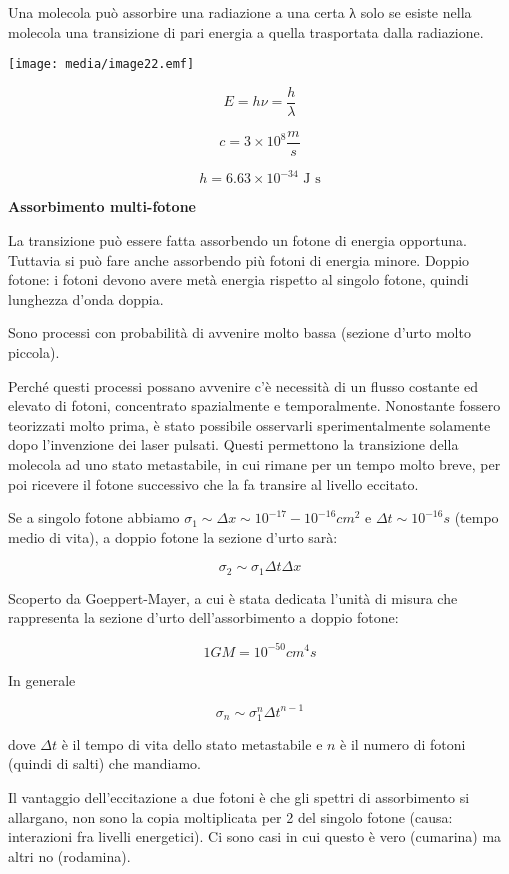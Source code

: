Una molecola può assorbire una radiazione a una certa λ solo se esiste
nella molecola una transizione di pari energia a quella trasportata
dalla radiazione.

\texttt{[image: media/image22.emf]}

\[E = h\nu = \frac{h}{\lambda}\]

\[c = 3 \times 10^{8}\frac{m}{s}\]

\[h = 6.63 \times 10^{- 34}\text{\ J\ s}\]

\textbf{Assorbimento multi-fotone}

La transizione può essere fatta assorbendo un fotone di energia
opportuna. Tuttavia si può fare anche assorbendo più fotoni di energia
minore. Doppio fotone: i fotoni devono avere metà energia rispetto al
singolo fotone, quindi lunghezza d'onda doppia.

Sono processi con probabilità di avvenire molto bassa (sezione d'urto
molto piccola).

Perché questi processi possano avvenire c'è necessità di un flusso
costante ed elevato di fotoni, concentrato spazialmente e temporalmente.
Nonostante fossero teorizzati molto prima, è stato possibile osservarli
sperimentalmente solamente dopo l'invenzione dei laser pulsati. Questi
permettono la transizione della molecola ad uno stato metastabile, in
cui rimane per un tempo molto breve, per poi ricevere il fotone
successivo che la fa transire al livello eccitato.

Se a singolo fotone abbiamo
\(\sigma_{1} \sim \Delta x \sim 10^{- 17} - 10^{- 16}cm^{2}\) e
\(\Delta t \sim 10^{- 16}s\) (tempo medio di vita), a doppio fotone la
sezione d'urto sarà:

\[\sigma_{2} \sim \sigma_{1}\Delta t\Delta x\]

Scoperto da Goeppert-Mayer, a cui è stata dedicata l'unità di misura che
rappresenta la sezione d'urto dell'assorbimento a doppio fotone:

\[1GM = 10^{- 50}cm^{4}s\]

In generale

\[\sigma_{n} \sim \sigma_{1}^{n}\Delta t^{n - 1}\]

dove \(\Delta t\) è il tempo di vita dello stato metastabile e \(n\) è
il numero di fotoni (quindi di salti) che mandiamo.

Il vantaggio dell'eccitazione a due fotoni è che gli spettri di
assorbimento si allargano, non sono la copia moltiplicata per 2 del
singolo fotone (causa: interazioni fra livelli energetici). Ci sono casi
in cui questo è vero (cumarina) ma altri no (rodamina).


